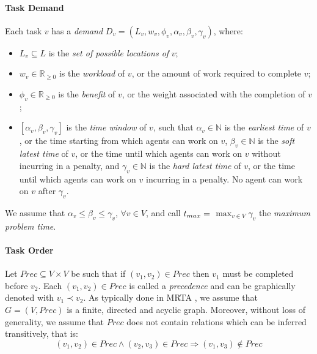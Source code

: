 \paragraph{Task Demand}

Each task $v$ has a \emph{demand} $D_v = (L_v, w_v, \phi_v, \alpha_v, \beta_v, \gamma_v)$,
where:
\begin{itemize}
    \item $L_v \subseteq L$ is the \emph{set of possible locations of} $v$;
    \item $w_v \in \mathbb{R}_{\geq 0}$ is the \emph{workload} of $v$, or the amount of
        work required to complete $v$;
    \item $\phi_v \in \mathbb{R}_{\geq 0}$ is the \emph{benefit} of $v$, or the weight
        associated with the completion of $v$;
    \item $\left[ \alpha_v, \beta_v, \gamma_v \right]$ is the \emph{time window} of $v$,
        such that $\alpha_v \in \mathbb{N}$ is the \emph{earliest time} of $v$, or the
        time starting from which agents can work on $v$, $\beta_v \in \mathbb{N}$ is the
        \emph{soft latest time} of $v$, or the time until which agents can work on $v$
        without incurring in a penalty, and $\gamma_v \in \mathbb{N}$ is the \emph{hard
        latest time} of $v$, or the time until which agents can work on $v$ incurring in a
        penalty. No agent can work on $v$ after $\gamma_v$.
\end{itemize}
We assume that $\alpha_v \leq \beta_v \leq \gamma_v$, $\forall v \in V$, and call $t_{max}
=$ $\max_{v \in V} \gamma_v$ the \emph{maximum problem time}.

\paragraph{Task Order}\label{sec:ordering}

Let $Prec \subseteq V \times V$ be such that if $(v_1, v_2) \in Prec$ then $v_1$ must be
completed before $v_2$. Each $(v_1, v_2) \in Prec$ is called a \emph{precedence} and can
be graphically denoted with $v_1 \prec v_2$. As typically done in MRTA
\cite{nunes2017taxonomy}, we assume that $G = (V, Prec)$ is a finite, directed and acyclic
graph. Moreover, without loss of generality, we assume that $Prec$ does not contain
relations which can be inferred transitively, that is:
\begin{equation*}
    (v_1, v_2) \in Prec \land (v_2, v_3) \in Prec \Rightarrow (v_1, v_3) \not\in Prec
\end{equation*}

